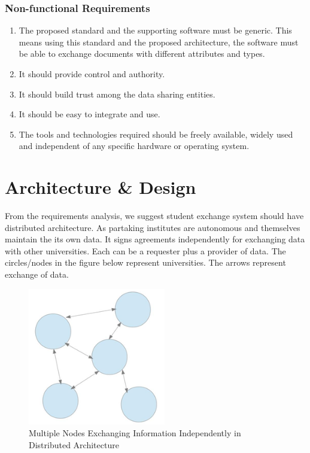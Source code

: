 \documentclass[12pt,a4paper,oneside]{book}
\begin{document}
    \subsection{Non-functional Requirements}

	\begin{enumerate}

		\item The proposed standard and the supporting software must be generic. This means using this standard and the proposed architecture, the software must be able to exchange documents with different attributes and types. 

		\item It should provide control and authority.
	
		\item It should build trust among the data sharing entities. 	
		
		\item It should be easy to integrate and use.
		
		\item The tools and technologies required should be freely available, widely used and independent of any specific hardware or operating system.

	\end{enumerate}

\chapter{Architecture \& Design}\label{ch-architecture-design}
From the requirements analysis, we suggest student exchange system should have distributed architecture. As partaking institutes are autonomous and themselves maintain the its own data. It signs agreements independently for exchanging data with other universities. Each can be a requester plus a provider of data. The circles/nodes in the figure below represent universities. The arrows represent exchange of data.

\begin{figure}[!htp]
  \centering
  \includegraphics[width=6cm]{architecture_distributed_independent_exchange.png}
  \caption{Multiple Nodes Exchanging Information Independently in Distributed Architecture \cite{The Mobility Project}}
  \label{fig:architecture_distributed_independent_exchange}
\end{figure}
\end{document}
